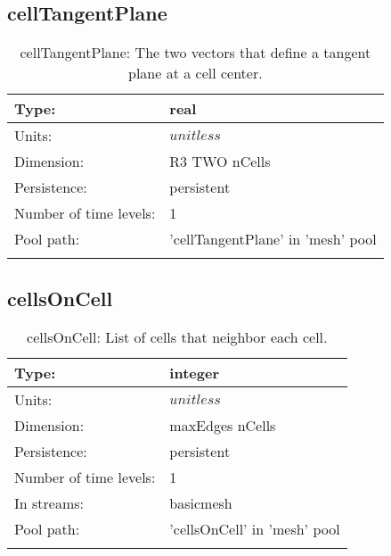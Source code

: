 \subsection[cellTangentPlane]{cellTangentPlane}
\label{subsec:var_sec_mesh_cellTangentPlane}
\begin{center}
\begin{longtable}{| p{2.0in} | p{4.0in} |}
        \hline 
        Type: & real \\
        \hline 
        Units: & $unitless$ \\
        \hline 
        Dimension: & R3 TWO nCells \\
        \hline 
        Persistence: & persistent \\
        \hline 
        Number of time levels: & 1 \\
        \hline 
            Pool path: & 'cellTangentPlane' in 'mesh' pool
 \\
		 \hline 
    \caption{cellTangentPlane: The two vectors that define a tangent plane at a cell center.}
\end{longtable}
\end{center}
\subsection[cellsOnCell]{cellsOnCell}
\label{subsec:var_sec_mesh_cellsOnCell}
\begin{center}
\begin{longtable}{| p{2.0in} | p{4.0in} |}
        \hline 
        Type: & integer \\
        \hline 
        Units: & $unitless$ \\
        \hline 
        Dimension: & maxEdges nCells \\
        \hline 
        Persistence: & persistent \\
        \hline 
        Number of time levels: & 1 \\
        \hline 
		 In streams: &  basicmesh \\
        \hline 
            Pool path: & 'cellsOnCell' in 'mesh' pool
 \\
		 \hline 
    \caption{cellsOnCell: List of cells that neighbor each cell.}
\end{longtable}
\end{center}
